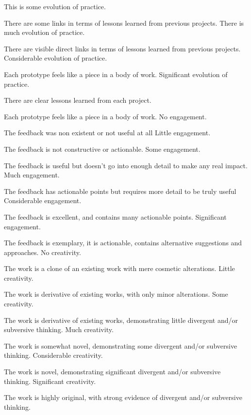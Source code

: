 \documentclass{../../fal_assignment}
\begin{document}
\begin{markingrubric}
	\grade This is some evolution of practice.
	\par There are some links in terms of lessons learned from previous projects.
	\grade There is much evolution of practice.
	\par There are visible direct links in terms of lessons learned from previous projects.
	\grade Considerable evolution of practice.
	\par Each prototype feels like a piece in a body of work.
	\grade Significant evolution of practice.
	\par There are clear lessons learned from each project.
	\par Each prototype feels like a piece in a body of work.
	\grade\fail No engagement.
	\par The feedback was non existent or not useful at all
	\grade Little engagement.
	\par The feedback is not constructive or actionable.
	\grade Some engagement.
	\par The feedback is useful but doesn't go into enough detail to make any real impact.
	\grade Much engagement.
	\par The feedback has actionable points but requires more detail to be truly useful
	\grade Considerable engagement.
	\par The feedback is excellent, and contains many actionable points.
	\grade Significant engagement.
	\par The feedback is exemplary, it is actionable, contains alternative suggestions and approaches.
	\grade\fail No creativity.
	\par The work is a clone of an existing work with mere cosmetic alterations.
	\grade Little creativity.
	\par The work is derivative of existing works, with only minor alterations.
	\grade Some creativity.
	\par The work is derivative of existing works, demonstrating little divergent and/or subversive thinking.
	\grade Much creativity.
	\par The work is somewhat novel, demonstrating some divergent and/or subversive thinking.
	\grade Considerable creativity.
	\par The work is novel, demonstrating significant divergent and/or subversive thinking.
	\grade Significant creativity.
	\par The work is highly original, with strong evidence of divergent and/or subversive thinking.
	
\end{markingrubric}
\end{document}
